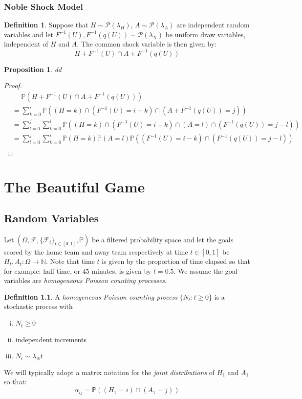 \documentclass[a4paper,11pt,oneside]{book}
\theoremstyle{plain}
\newtheorem{prop}[thm]{Proposition}
\theoremstyle{definition}
\newtheorem{defn}{Definition}[section]
\begin{document}
\subsection{Noble Shock Model}
\begin{defn}
Suppose that $H \sim \mathcal{P}(\lambda_H)$, $A \sim \mathcal{P}(\lambda_A)$ are independent random variables and let $F^{-1}(U), F^{-1}(q(U)) \sim \mathcal{P}(\lambda_X)$ be uniform draw variables, independent of $H$ and $A$. The common shock variable is then given by: \[H+F^{-1}(U) \cap A+F^{-1}(q(U))\]
\end{defn}
\begin{prop}
dd
\end{prop}
\begin{proof}
\begin{align*}
&\phantom{=}\mathbb{P}(H+F^{-1}(U) \cap A+F^{-1}(q(U)))\\
&=\sum_{k=0}^i \mathbb{P}((H=k)\cap (F^{-1}(U)=i-k)\cap (A+F^{-1}(q(U))=j))\\
&=\sum_{l=0}^j\sum_{k=0}^i \mathbb{P}((H=k)\cap (F^{-1}(U)=i-k)\cap (A=l)\cap (F^{-1}(q(U))=j-l))\\
&=\sum_{l=0}^j\sum_{k=0}^i \mathbb{P}(H=k)\mathbb{P} (A=l)\mathbb{P}((F^{-1}(U)=i-k)\cap (F^{-1}(q(U))=j-l)) \\
\end{align*}

\end{proof}

\chapter{The Beautiful Game}
\section{Random Variables }
Let $(\Omega,\mathcal{F},\{\mathcal{F}_t\}_{t \in [0,1]},\mathbb{P})$ be a filtered probability space and let the goals scored by the home team and away team respectively at time $t \in [0,1]$ be $H_t,A_t:\Omega\rightarrow \mathbb{N}$. Note that time $t$ is given by the proportion of time elapsed so that for example: half time, or $45$ minutes, is given by $t=0.5$. We assume the goal variables are \emph{homogeneous Poisson counting processes}.
\begin{defn} A \emph{homogeneous Poisson counting process} $\{N_t:t \ge 0\}$ is a stochastic process with
\begin{enumerate}[i.]
\item $N_t \ge 0$
\item independent increments
\item $N_t \sim \lambda_Nt$
\end{enumerate} 
\end{defn}
We will typically adopt a matrix notation for the \emph{joint distributions} of $H_1$ and $A_1$ so that: \[\alpha_{ij}=\mathbb{P}((H_1=i)\cap (A_1=j))\]
\end{document}

